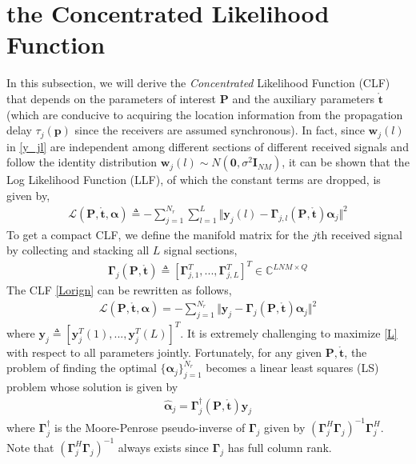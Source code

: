 \documentclass[review]{elsarticle}
\begin{document}
\section{the Concentrated Likelihood Function}
In this subsection, we will derive the \emph{Concentrated} Likelihood Function (CLF) that depends on the parameters of interest $\boldsymbol{P}$ and the auxiliary parameters $\mathring{\boldsymbol{t}}$ (which are conducive to acquiring the location information from the propagation delay $\tau_j(\boldsymbol{p})$ since the receivers are assumed synchronous). In fact, since $\boldsymbol{w}_j(l)$ in \eqref{y_jl} are independent among different sections of different received signals and follow the identity distribution $\boldsymbol{w}_j(l)\sim N(\boldsymbol{0},\sigma^2\boldsymbol{I}_{NM})$, it can be shown that the Log Likelihood Function (LLF), of which the constant terms are dropped, is given by,
\begin{align}\label{Lorign}
\mathcal{L}(\boldsymbol{P},\mathring{\boldsymbol{t}},\boldsymbol{\alpha})\triangleq-\sum_{j=1}^{N_r}\sum_{l=1}^L\Vert \boldsymbol{y}_j(l)-\boldsymbol{\Gamma}_{j,l}(\boldsymbol{P},\mathring{\boldsymbol{t}})\boldsymbol{\alpha}_j\Vert^2
\end{align}
To get a compact CLF, we define the manifold matrix for the $j$th received signal by collecting and stacking all $L$ signal sections,
\begin{align}\label{Gammaj}
    \boldsymbol{\Gamma}_{j}(\boldsymbol{P},\mathring{\boldsymbol{t}})\triangleq[\boldsymbol{\Gamma}_{j,1}^T,...,\boldsymbol{\Gamma}_{j,L}^T]^T\in \mathbb{C}^{LNM\times Q}
\end{align}
The CLF \eqref{Lorign} can be rewritten as follows,
\begin{align}\label{L}
    \mathcal{L}(\boldsymbol{P},\mathring{\boldsymbol{t}},\boldsymbol{\alpha})=-\sum_{j=1}^{N_r}\Vert \boldsymbol{y}_j-\boldsymbol{\Gamma}_{j}(\boldsymbol{P},\mathring{\boldsymbol{t}})\boldsymbol{\alpha}_j\Vert^2
\end{align}
where $\boldsymbol{y}_j\triangleq[\boldsymbol{y}_j^T(1),...,\boldsymbol{y}_j^T(L)]^T$. It is extremely challenging to maximize \eqref{L} with respect to all parameters jointly. Fortunately, for any given $\boldsymbol{P},\mathring{\boldsymbol{t}}$, the problem of finding the optimal $\lbrace \boldsymbol{\alpha}_j\rbrace _{j=1}^{N_r}$ becomes a linear least squares (LS) problem \cite{Golub1973The} whose solution is given by
\begin{align}
    \hat{\boldsymbol{\alpha}}_j=\boldsymbol{\Gamma}_{j}^\dagger(\boldsymbol{P},\mathring{\boldsymbol{t}})\boldsymbol{y}_j
\end{align}
where $\boldsymbol{\Gamma}_{j}^\dagger$ is the Moore-Penrose pseudo-inverse of $\boldsymbol{\Gamma}_{j}$ given by $(\boldsymbol{\Gamma}_{j}^H\boldsymbol{\Gamma}_{j})^{-1}\boldsymbol{\Gamma}_{j}^H$. Note that $(\boldsymbol{\Gamma}_{j}^H\boldsymbol{\Gamma}_{j})^{-1}$ always exists since $\boldsymbol{\Gamma}_{j}$ has full column rank. 
\end{document}
